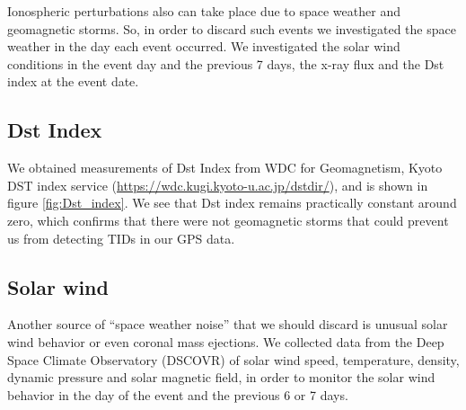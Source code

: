 Ionospheric perturbations also can take place due to space weather and geomagnetic storms. So, in order to discard such events we investigated the space weather in the day each event occurred. We investigated the solar wind conditions in the event day and the previous 7 days, the x-ray flux %
and the Dst index at the event date.   




\subsection{Dst Index}

We obtained measurements of Dst Index from WDC for Geomagnetism, Kyoto DST index service (\url{https://wdc.kugi.kyoto-u.ac.jp/dstdir/}), and is shown in figure \ref{fig:Dst_index}. We see that  Dst index remains practically constant around zero, which confirms that there were not geomagnetic storms that could prevent us from detecting TIDs in our GPS data.

\subsection{Solar wind}

Another source of ``space weather noise'' that we should discard is unusual solar wind behavior or even coronal mass ejections. We collected data from the Deep Space Climate Observatory (DSCOVR) of solar wind speed, temperature, density, dynamic pressure and solar magnetic field, in order to monitor the solar wind behavior in the day of the event and the previous 6 or 7 days.%

